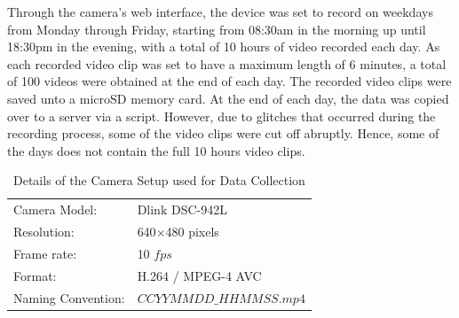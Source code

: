 Through the camera's web interface, the device was set to record on weekdays from Monday through Friday, starting from 08:30am in the morning up until 18:30pm in the evening, with a total of 10 hours of video recorded each day. As each recorded video clip was set to have a maximum length of 6 minutes, a total of 100 videos were obtained at the end of each day. The recorded video clips were saved unto a microSD memory card.
At the end of each day, the data was copied over to a server via a script. However, due to glitches that occurred during the recording process, some of the video clips were cut off abruptly. Hence, some of the days does not contain the full 10 hours video clips.

\begin{table}[!ht]\centering
\begin{tabular}{ll}
Camera Model: & Dlink DSC-942L        \\
Resolution:   & 640$\times$480 pixels \\
Frame rate:   & 10 $fps$             \\
Format:       & H.264 / MPEG-4 AVC    \\
Naming Convention: & $CCYYMMDD\_HHMMSS.mp4$
\end{tabular}
\vspace{1em}
\caption{Details of the Camera Setup used for Data Collection}
\end{table}

